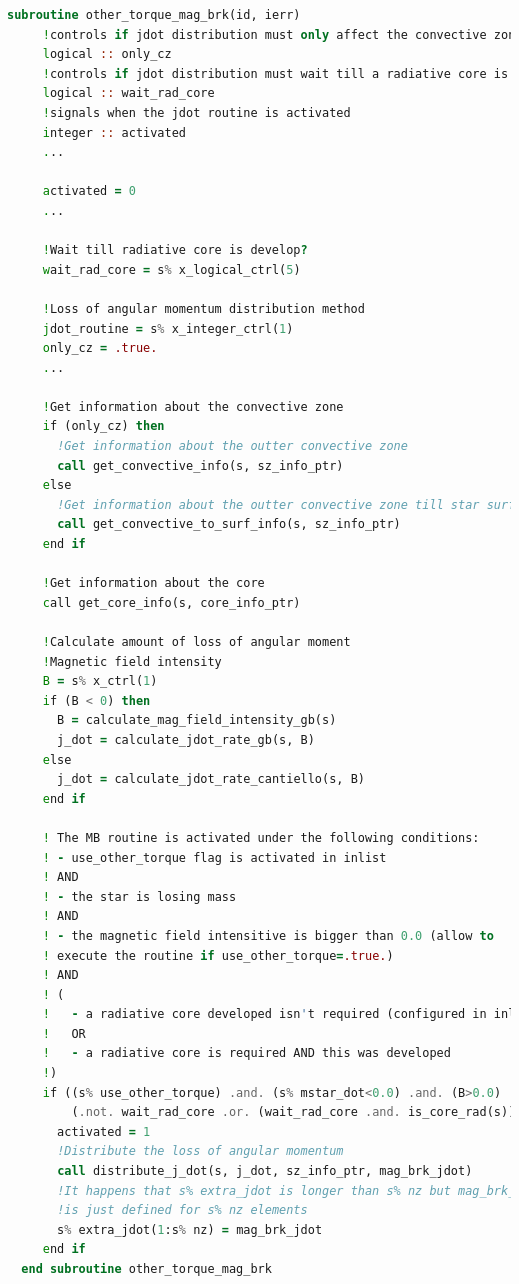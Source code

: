 \begin{lstlisting}[language=Fortran, float, caption={Rutina de frenado magnético.}, label={lst:torque_mb_hook}]
  subroutine other_torque_mag_brk(id, ierr) 
     !controls if jdot distribution must only affect the convective zone
     logical :: only_cz
     !controls if jdot distribution must wait till a radiative core is develop
     logical :: wait_rad_core
     !signals when the jdot routine is activated          
     integer :: activated 
     ...
       
     activated = 0
     ...
     
     !Wait till radiative core is develop?
     wait_rad_core = s% x_logical_ctrl(5)

     !Loss of angular momentum distribution method
     jdot_routine = s% x_integer_ctrl(1)
     only_cz = .true.
     ...

     !Get information about the convective zone
     if (only_cz) then
       !Get information about the outter convective zone
       call get_convective_info(s, sz_info_ptr)
     else
       !Get information about the outter convective zone till star surface
       call get_convective_to_surf_info(s, sz_info_ptr)
     end if

     !Get information about the core
     call get_core_info(s, core_info_ptr)

     !Calculate amount of loss of angular moment
     !Magnetic field intensity
     B = s% x_ctrl(1)
     if (B < 0) then
       B = calculate_mag_field_intensity_gb(s)
       j_dot = calculate_jdot_rate_gb(s, B)
     else
       j_dot = calculate_jdot_rate_cantiello(s, B)
     end if
         
     ! The MB routine is activated under the following conditions:
     ! - use_other_torque flag is activated in inlist
     ! AND
     ! - the star is losing mass
     ! AND
     ! - the magnetic field intensitive is bigger than 0.0 (allow to 
     ! execute the routine if use_other_torque=.true.)
     ! AND
     ! (
     !   - a radiative core developed isn't required (configured in inlist)
     !   OR
     !   - a radiative core is required AND this was developed
     !)
     if ((s% use_other_torque) .and. (s% mstar_dot<0.0) .and. (B>0.0) .and. &
         (.not. wait_rad_core .or. (wait_rad_core .and. is_core_rad(s)))) then
       activated = 1
       !Distribute the loss of angular momentum
       call distribute_j_dot(s, j_dot, sz_info_ptr, mag_brk_jdot)
       !It happens that s% extra_jdot is longer than s% nz but mag_brk_jdot
       !is just defined for s% nz elements
       s% extra_jdot(1:s% nz) = mag_brk_jdot
     end if
  end subroutine other_torque_mag_brk
\end{lstlisting}

\endinput

